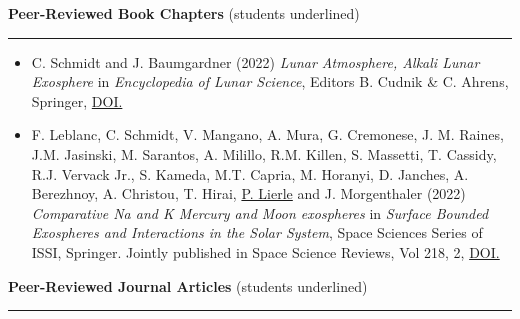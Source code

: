 \documentclass[12pt]{report}
\begin{document}
\noindent\textbf{Peer-Reviewed Book Chapters} (students underlined) \rm\hspace*{\fill} \\
\rule{\textwidth}{1pt}
\begin{itemize} \itemsep -2pt %
  \item C. Schmidt and J. Baumgardner (2022) \textit{Lunar Atmosphere, Alkali Lunar Exosphere} in \textit{Encyclopedia of Lunar Science}, Editors B. Cudnik \& C. Ahrens, Springer, \href{https://doi.org/10.1007/978-3-319-05546-6_230-1}{DOI.}
  \item F. Leblanc, C. Schmidt, V. Mangano, A. Mura, G. Cremonese, J. M. Raines, J.M. Jasinski, M. Sarantos, A. Milillo, R.M. Killen, S. Massetti, T. Cassidy, R.J. Vervack Jr., S. Kameda, M.T. Capria, M. Horanyi, D. Janches, A. Berezhnoy, A. Christou, T. Hirai, \underline{P. Lierle} and J. Morgenthaler (2022) \textit{Comparative Na and K Mercury and Moon exospheres} in \textit{Surface Bounded Exospheres and Interactions in the Solar System}, Space Sciences Series of ISSI, Springer. Jointly published in Space Science Reviews, Vol 218, 2, \href{ https://doi.org/10.1007/s11214-022-00871-w}{DOI.}
 \end{itemize}
\vspace{2 mm}
\noindent\textbf{Peer-Reviewed Journal Articles} (students underlined) \rm\hspace*{\fill} \\
\rule{\textwidth}{1pt}
\end{document}
